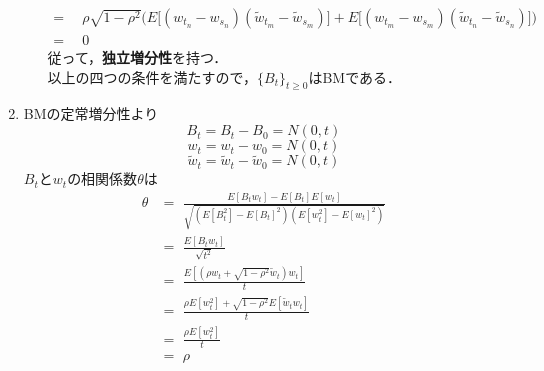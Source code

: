 \documentclass{jsarticle}
\begin{document}
\begin{enumerate}
\begin{itemize}
\[\begin{split}
=&\,\,\, \rho\sqrt{1-\rho^2}\Bigr( E \Bigr[(w_{t_n} - w_{s_n})(\tilde{w}_{t_m} - \tilde{w}_{s_m})\Bigr] +  E \Bigr [(w_{t_m} - w_{s_m})(\tilde{w}_{t_n} - \tilde{w}_{s_n}) \Bigr] \Bigr)\\
=&\,\,\, 0
\end{split}
\]
従って，{\bf 独立増分性}を持つ．\\
以上の四つの条件を満たすので，$\{B_t\}_{t\ge0}$はBMである．
\end{itemize}
\item
BMの定常増分性より
\[ B_t = B_t - B_0 = N(0, t) \]
\[ w_t = w_t - w_0 = N(0,t) \]
\[ \tilde{w}_t = \tilde{w}_t - \tilde{w}_0 = N(0,t) \]
$B_t$と$w_t$の相関係数$\theta$は
\[
\begin{split}
\theta &=\,\,  \frac{ E[B_t w_t] - E[B_t]E[w_t] }{ \sqrt{ (E[B_t^2] - E[B_t]^2) (E[w_t^2] - E[w_t]^2) } }\\
&=\,\,  \frac{ E[B_t w_t] }{ \sqrt{ t^2 }}\\
&=\,\,  \frac{ E[ (\rho w_t + \sqrt{1-\rho^2}\tilde{w}_t)w_t ] }{ t}\\
&=\,\,  \frac{ \rho E[w_t^2] + \sqrt{1-\rho^2}E[\tilde{w}_t w_t] }{ t}\\
&=\,\,  \frac{ \rho E[w_t^2] }{ t}\\
&=\,\,  \rho
\end{split}
\]

\end{enumerate}
\end{document}
